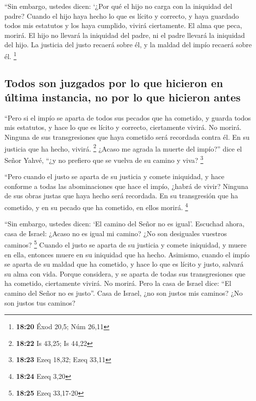  ``Sin embargo, ustedes dicen: `¿Por qué el hijo no carga
con la iniquidad del padre? Cuando el hijo haya hecho lo que es lícito y
correcto, y haya guardado todos mis estatutos y los haya cumplido,
vivirá ciertamente.  El alma que peca, morirá. El hijo no
llevará la iniquidad del padre, ni el padre llevará la iniquidad del
hijo. La justicia del justo recaerá sobre él, y la maldad del impío
recaerá sobre él. \footnote{\textbf{18:20} Éxod 20,5; Núm 26,11}

\hypertarget{todos-son-juzgados-por-lo-que-hicieron-en-uxfaltima-instancia-no-por-lo-que-hicieron-antes}{%
\subsection{Todos son juzgados por lo que hicieron en última instancia,
no por lo que hicieron
antes}\label{todos-son-juzgados-por-lo-que-hicieron-en-uxfaltima-instancia-no-por-lo-que-hicieron-antes}}

 ``Pero si el impío se aparta de todos sus pecados que ha
cometido, y guarda todos mis estatutos, y hace lo que es lícito y
correcto, ciertamente vivirá. No morirá.  Ninguna de sus
transgresiones que haya cometido será recordada contra él. En su
justicia que ha hecho, vivirá. \footnote{\textbf{18:22} Is 43,25; Is
  44,22}  ¿Acaso me agrada la muerte del impío?'' dice el
Señor Yahvé, ``¿y no prefiero que se vuelva de su camino y viva?
\footnote{\textbf{18:23} Ezeq 18,32; Ezeq 33,11}

 ``Pero cuando el justo se aparta de su justicia y comete
iniquidad, y hace conforme a todas las abominaciones que hace el impío,
¿habrá de vivir? Ninguna de sus obras justas que haya hecho será
recordada. En su transgresión que ha cometido, y en su pecado que ha
cometido, en ellos morirá. \footnote{\textbf{18:24} Ezeq 3,20}

 ``Sin embargo, ustedes dicen: `El camino del Señor no es
igual'. Escuchad ahora, casa de Israel: ¿Acaso no es igual mi camino?
¿No son desiguales vuestros caminos? \footnote{\textbf{18:25} Ezeq
  33,17-20}  Cuando el justo se aparta de su justicia y
comete iniquidad, y muere en ella, entonces muere en su iniquidad que ha
hecho.  Asimismo, cuando el impío se aparta de su maldad
que ha cometido, y hace lo que es lícito y justo, salvará su alma con
vida.  Porque considera, y se aparta de todas sus
transgresiones que ha cometido, ciertamente vivirá. No morirá.
 Pero la casa de Israel dice: ``El camino del Señor no es
justo''. Casa de Israel, ¿no son justos mis caminos? ¿No son justos tus
caminos?

